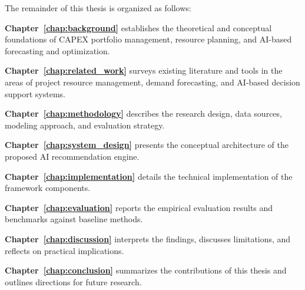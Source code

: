 The remainder of this thesis is organized as follows:

\textbf{Chapter~\ref{chap:background}} establishes the theoretical and conceptual foundations of CAPEX portfolio management, resource planning, and AI-based forecasting and optimization.

\textbf{Chapter~\ref{chap:related_work}} surveys existing literature and tools in the areas of project resource management, demand forecasting, and AI-based decision support systems.

\textbf{Chapter~\ref{chap:methodology}} describes the research design, data sources, modeling approach, and evaluation strategy.

\textbf{Chapter~\ref{chap:system_design}} presents the conceptual architecture of the proposed AI recommendation engine.

\textbf{Chapter~\ref{chap:implementation}} details the technical implementation of the framework components.

\textbf{Chapter~\ref{chap:evaluation}} reports the empirical evaluation results and benchmarks against baseline methods.

\textbf{Chapter~\ref{chap:discussion}} interprets the findings, discusses limitations, and reflects on practical implications.

\textbf{Chapter~\ref{chap:conclusion}} summarizes the contributions of this thesis and outlines directions for future research.
